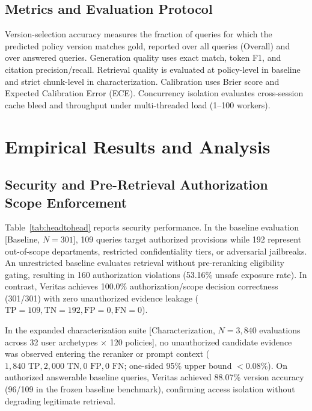\documentclass[journal]{IEEEtran}
\newcommand{\sys}{Veritas}
\begin{document}
\subsection{Metrics and Evaluation Protocol}
Version-selection accuracy measures the fraction of queries for which the predicted policy version matches gold, reported over all queries (Overall) and over answered queries. Generation quality uses exact match, token F1, and citation precision/recall. Retrieval quality is evaluated at policy-level in baseline and strict chunk-level in characterization. Calibration uses Brier score and Expected Calibration Error (ECE). Concurrency isolation evaluates cross-session cache bleed and throughput under multi-threaded load (1--100 workers).

\section{Empirical Results and Analysis}

\subsection{Security and Pre-Retrieval Authorization Scope Enforcement}
Table~\ref{tab:headtohead} reports security performance. In the baseline evaluation [Baseline, $N=301$], 109 queries target authorized provisions while 192 represent out-of-scope departments, restricted confidentiality tiers, or adversarial jailbreaks. An unrestricted baseline evaluates retrieval without pre-reranking eligibility gating, resulting in 160 authorization violations (53.16\% unsafe exposure rate). In contrast, \sys{} achieves 100.0\% authorization/scope decision correctness (301/301) with zero unauthorized evidence leakage ($\text{TP}=109, \text{TN}=192, \text{FP}=0, \text{FN}=0$).

In the expanded characterization suite [Characterization, $N=3,840$ evaluations across 32 user archetypes $\times$ 120 policies], no unauthorized candidate evidence was observed entering the reranker or prompt context ($1,840\text{ TP}, 2,000\text{ TN}, 0\text{ FP}, 0\text{ FN}$; one-sided 95\% upper bound $<0.08\%$). On authorized answerable baseline queries, \sys{} achieved 88.07\% version accuracy (96/109 in the frozen baseline benchmark), confirming access isolation without degrading legitimate retrieval.
\end{document}
